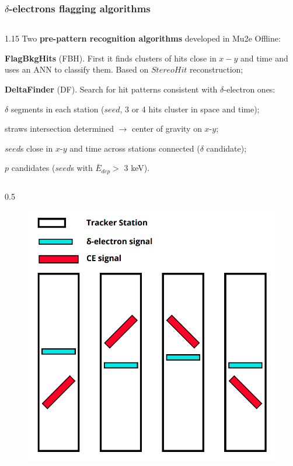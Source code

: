 \documentclass{beamer}
\begin{document}
\begin{frame}
    \frametitle{$\delta$-electrons flagging algorithms}
      \begin{columns}
        \begin{column}{1.15\framewidth}
       {\small Two \textbf{pre-pattern recognition  algorithms} developed in Mu2e Offline:}
    \setlength{\leftmargini}{1.2em}
    \begin{itemize}
    {\small   
    \item \textbf{FlagBkgHits} (FBH). First it finds clusters of hits close in $x-y$ and time and uses an ANN to classify them. Based on $StereoHit$ reconstruction;
    \item \textbf{DeltaFinder} (DF). Search for hit patterns consistent with $\delta$-electron ones:
    }
    \begin{itemize}
        {\small \item $\delta$ segments in each station ($seed$,  3 or 4 hits cluster in space and time);
\item  straws intersection determined $\rightarrow$ center of gravity on $x$-$y$; 
\item $seed$s close in $x$-$y$ and time 
across stations connected ($\delta$ candidate); 
\item $p$ candidates ($seed$s with $\bar{E}_{dep}>$ 3 keV).}
    \end{itemize}
    \end{itemize}
    \end{column}
    \end{columns}
    \vspace{-3mm}
        \begin{columns}
        \begin{column}{0.5\framewidth}
            \begin{figure}[!h]
        \centering
        \hspace*{-2em}
        \includegraphics[width =0.6\columnwidth]{figures/png/Screenshot_20240811_123048.png}

\end{figure}
\end{column}
\end{columns}
\end{frame}
\end{document}
